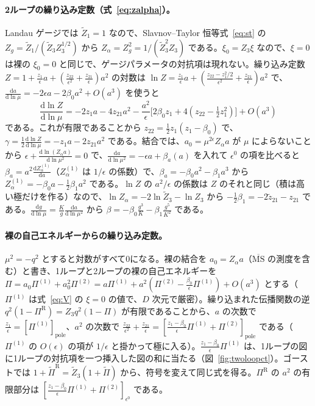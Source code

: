 \documentclass[a4paper,10pt]{ltjsarticle}
\newcommand{\dd}{\mathrm{d}}
\newcommand{\MSbar}{\overline{\mathrm{MS}}}
\begin{document}
\paragraph{2ループの繰り込み定数（式~\eqref{eq:zalpha}）。}Landau ゲージでは $\tilde Z_1=1$ なので、Slavnov--Taylor 恒等式~\eqref{eq:st} の $Z_g=\tilde Z_1/(\tilde Z_3Z_3^{1/2})$ から $Z_\alpha=Z_g^2=1/(\tilde Z_3^2Z_3)$ である。$\xi_0=Z_3\xi$ なので、$\xi=0$ は裸の $\xi_0=0$ と同じで、ゲージパラメータの対抗項は現れない。繰り込み定数 $Z=1+\frac{z_1}\epsilon a+(\frac{z_{22}}{\epsilon^2}+\frac{z_{21}}\epsilon)a^2$ の対数は $\ln Z=\frac{z_1}\epsilon a+(\frac{z_{22}-z_1^2/2}{\epsilon^2}+\frac{z_{21}}\epsilon)a^2$ で、$\frac{\dd a}{\dd\ln\mu}=-2\epsilon a-2\beta_0a^2+O(a^3)$ を使うと
\begin{equation*}
\frac{\dd\ln Z}{\dd\ln\mu}=-2z_1a-4z_{21}a^2-\frac{a^2}{\epsilon}\bigl[2\beta_0z_1+4(z_{22}-\tfrac12z_1^2)\bigr]+O(a^3)
\end{equation*}
である。これが有限であることから $z_{22}=\frac12z_1(z_1-\beta_0)$ で、$\gamma=\frac12\frac{\dd\ln Z}{\dd\ln\mu}=-z_1a-2z_{21}a^2$ である。結合では、$a_0=\mu^{2\epsilon}Z_\alpha a$ が $\mu$ によらないことから $\epsilon+\frac{\dd\ln(Z_\alpha a)}{\dd\ln\mu^2}=0$ で、$\frac{\dd a}{\dd\ln\mu^2}=-\epsilon a+\beta_a(a)$ を入れて $\epsilon^0$ の項を比べると $\beta_a=a^2\frac{\dd Z_\alpha^{(1)}}{\dd a}$（$Z_\alpha^{(1)}$ は $1/\epsilon$ の係数）で、$\beta_a=-\beta_0a^2-\beta_1a^3$ から $Z_\alpha^{(1)}=-\beta_0a-\frac12\beta_1a^2$ である。$\ln Z$ の $a^2/\epsilon$ の係数は $Z$ のそれと同じ（積は高い極だけを作る）なので、$\ln Z_\alpha=-2\ln\tilde Z_3-\ln Z_3$ から $-\frac12\beta_1=-2\tilde z_{21}-z_{21}$ である。$\frac{\dd g}{\dd\ln\mu}=\frac{K}{g}\frac{\dd a}{\dd\ln\mu^2}$ から $\beta=-\beta_0\frac{g^3}K-\beta_1\frac{g^5}{K^2}$ である。

\paragraph{裸の自己エネルギーからの繰り込み定数。}$\mu^2=-q^2$ とすると対数がすべて0になる。裸の結合を $a_0=Z_\alpha a$（$\MSbar$ の測度を含む）と書き、1ループと2ループの裸の自己エネルギーを $\Pi=a_0\Pi^{(1)}+a_0^2\Pi^{(2)}=a\Pi^{(1)}+a^2(\Pi^{(2)}-\frac{\beta_0}\epsilon\Pi^{(1)})+O(a^3)$ とする（$\Pi^{(1)}$ は式~\eqref{eq:V} の $\xi=0$ の値で、$D$ 次元で厳密）。繰り込まれた伝播関数の逆 $q^2(1-\Pi^{\mathrm R})=Z_3q^2(1-\Pi)$ が有限であることから、$a$ の次数で $\frac{z_1}\epsilon=[\Pi^{(1)}]_{\mathrm{pole}}$、$a^2$ の次数で $\frac{z_{22}}{\epsilon^2}+\frac{z_{21}}{\epsilon}=[\frac{z_1-\beta_0}{\epsilon}\Pi^{(1)}+\Pi^{(2)}]_{\mathrm{pole}}$ である（$\Pi^{(1)}$ の $O(\epsilon)$ の項が $1/\epsilon$ と掛かって極に入る）。$\frac{z_1-\beta_0}{\epsilon}\Pi^{(1)}$ は、1ループの図に1ループの対抗項を一つ挿入した図の和に当たる（図~\ref{fig:twoloopct}）。ゴーストでは $1+\tilde\Pi^{\mathrm R}=\tilde Z_3(1+\tilde\Pi)$ から、符号を変えて同じ式を得る。$\Pi^{\mathrm R}$ の $a^2$ の有限部分は $[\frac{z_1-\beta_0}{\epsilon}\Pi^{(1)}+\Pi^{(2)}]_{\epsilon^0}$ である。
\end{document}
